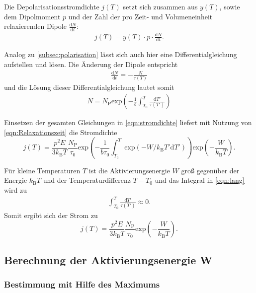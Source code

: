 Die Depolarisationsstromdichte $j(T)$ setzt sich zusammen aus $y(T)$, sowie dem Dipolmoment $p$ und der Zahl der pro Zeit- und Volumeneinheit 
relaxierenden Dipole $\frac{\text{d}N}{\text{d}t}$:
\begin{align}
    j(T) = y(T) \cdot p \cdot \frac{\text{d}N}{\text{d}t}.
    \label{eqn:stromdichte}
\end{align}

Analog zu \autoref{subsec:polarisation} lässt sich auch hier eine Differentialgleichung aufstellen und lösen.
Die Änderung der Dipole entspricht
\begin{align}
    \frac{\text{d} N}{\text{d} t} = -\frac{N}{\tau(T)}
\end{align}
und die Lösung dieser Differentialgleichung lautet somit 
\begin{align}
    N = N_\text{P} \text{exp}\left(-\frac{1}{b}\int_{T_0}^T\frac{\text{d}T'}{\tau(T')}\right)
\end{align}

Einsetzen der gesamten Gleichungen in \autoref{eqn:stromdichte} liefert mit Nutzung von \autoref{eqn:Relaxationszeit} die Stromdichte
\begin{equation}
  j(T) = \frac{p^2E}{3k_\text{B}T}\frac{N_\text{P}}{\tau_0}\text{exp}\left(-\frac{1}{b\tau_0}\int_{T_0}^T\text{exp}(-W/ k_ \text{B}T'\text{d}T')\right)\text{exp}\left(-\frac{W}{k_\text{B}T}\right).
 \label{eqn:lang}
\end{equation}

Für kleine Temperaturen $T$ ist die Aktivierungsenergie $W$ groß gegenüber der Energie $k_\text{B}T$ und der Temperaturdifferenz $T-T_0$ und das Integral in \autoref{eqn:lang} wird zu
\begin{align}
    \int_{T_0}^T\frac{\text{d}T'}{\tau(T')} \approx 0.
\end{align}
Somit ergibt sich der Strom zu
\begin{equation}
    j(T) = \frac{p^2E}{3k_\text{B}T}\frac{N_\text{P}}{\tau_0} \text{exp}\left(-\frac{W}{k_\text{B}T}\right).
    \label{eqn:kurz}
\end{equation}


\subsection{Berechnung der Aktivierungsenergie W}

\subsubsection{Bestimmung mit Hilfe des Maximums}

